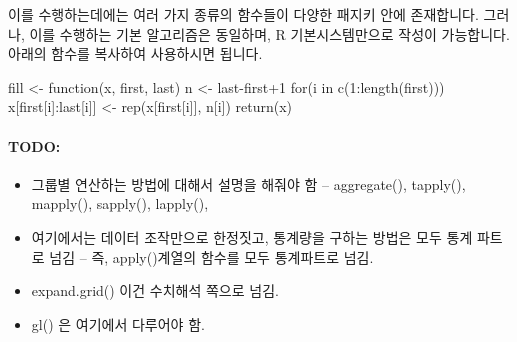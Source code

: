 이를 수행하는데에는 여러 가지 종류의 함수들이 다양한 패지키 안에 존재합니다.  
그러나, 이를 수행하는 기본 알고리즘은 동일하며, R 기본시스템만으로 작성이 가능합니다. 
아래의 함수를 복사하여 사용하시면 됩니다. 

\begin{Schunk}
	\begin{Soutput}
fill <- function(x, first, last){
	n <- last-first+1
	for(i in c(1:length(first))) x[first[i]:last[i]] <- rep(x[first[i]], n[i])
	return(x)
}
	\end{Soutput}
\end{Schunk}




\paragraph{TODO:}
\begin{itemize}
\item 그룹별 연산하는 방법에 대해서 설명을 해줘야 함 -- aggregate(), tapply(), mapply(), sapply(), lapply(), 
\item 여기에서는 데이터 조작만으로 한정짓고, 통계량을 구하는 방법은 모두 통계 파트로 넘김 -- 즉, apply()계열의 함수를 모두 통계파트로 넘김.
\item expand.grid() 이건 수치해석 쪽으로 넘김. 
\item gl() 은 여기에서 다루어야 함.
\end{itemize}


